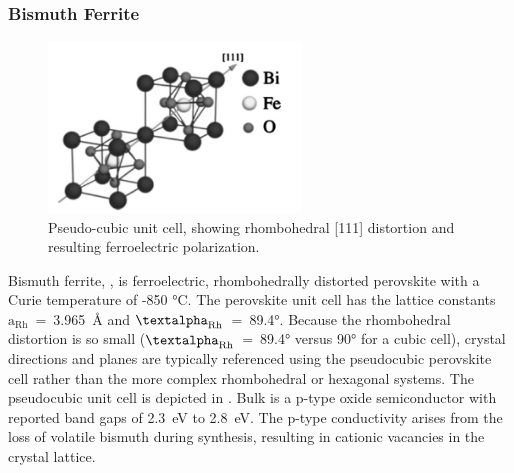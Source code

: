 \subsubsection{Bismuth Ferrite}
\label{subsubsec:background.bfo}

\begin{figure}
\begin{center}
\includegraphics[width=0.6\textwidth]{bfocell.pdf}
\caption[Pseudo-cubic  unit cell]{%
	Pseudo-cubic  unit cell, showing rhombohedral [111] 
	distortion and resulting ferroelectric polarization.\cite{Catalan:2009ca}}
\label{fig:bfocell}
\end{center}
\end{figure}

Bismuth ferrite, , is ferroelectric, rhombohedrally distorted perovskite with a
Curie temperature of -850
\si{\degreeCelsius}.\cite{Kornev:2007jr,Catalan:2009ca,Anonymous:htMDB4Eh,Miao:2008fz} The
perovskite unit cell has the lattice constants
$\text{a}_{\text{Rh}}$~=~3.965~\si{\angstrom} and
$\text{\textalpha}_{\text{Rh}}$~=~89.4\si{\degree}.\cite{Kubel:1990kd} Because the
rhombohedral distortion is so small ($\text{\textalpha}_{\text{Rh}}$~=~89.4\si{\degree}
versus 90\si{\degree} for a cubic cell), crystal directions and planes are typically
referenced using the pseudocubic perovskite cell rather than the more complex rhombohedral
or hexagonal systems.  The pseudocubic unit cell is depicted in . Bulk
 is a p-type oxide semiconductor with reported band gaps of 2.3~eV to
2.8~eV.\cite{Ihlefeld:2008hl,Clark:2007bt,Kumar:2008fr} The p-type conductivity arises
from the loss of volatile bismuth during synthesis, resulting in cationic vacancies in the
crystal lattice. 

